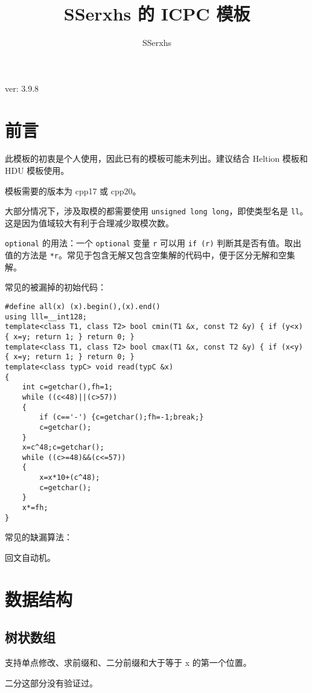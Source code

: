 \documentclass[12pt]{ctexart}
\author{SSerxhs}
\title{SSerxhs 的 ICPC 模板}
\begin{document}
\maketitle

\centerline{ver: 3.9.8}

\tableofcontents

\newpage

\section{前言}

此模板的初衷是个人使用，因此已有的模板可能未列出。建议结合 Heltion 模板和 HDU 模板使用。

模板需要的版本为 cpp17 或 cpp20。

大部分情况下，涉及取模的都需要使用 \verb|unsigned long long|，即使类型名是 \verb|ll|。这是因为值域较大有利于合理减少取模次数。

\verb|optional| 的用法：一个 \verb|optional| 变量 \verb|r| 可以用 \verb|if (r)| 判断其是否有值。取出值的方法是 \verb|*r|。常见于包含无解又包含空集解的代码中，便于区分无解和空集解。

常见的被漏掉的初始代码：
\begin{lstlisting}
#define all(x) (x).begin(),(x).end()
using lll=__int128;
template<class T1, class T2> bool cmin(T1 &x, const T2 &y) { if (y<x) { x=y; return 1; } return 0; }
template<class T1, class T2> bool cmax(T1 &x, const T2 &y) { if (x<y) { x=y; return 1; } return 0; }
template<class typC> void read(typC &x)
{
	int c=getchar(),fh=1;
	while ((c<48)||(c>57))
	{
		if (c=='-') {c=getchar();fh=-1;break;}
		c=getchar();
	}
	x=c^48;c=getchar();
	while ((c>=48)&&(c<=57))
	{
		x=x*10+(c^48);
		c=getchar();
	}
	x*=fh;
}
\end{lstlisting}

常见的缺漏算法：

回文自动机。

\newpage

\section{数据结构}

\subsection{树状数组}

支持单点修改、求前缀和、二分前缀和大于等于 x 的第一个位置。

二分这部分没有验证过。
\end{document}
